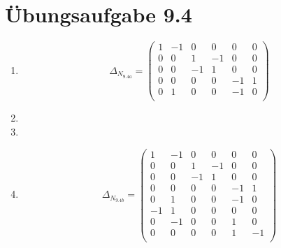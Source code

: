 \documentclass[a4paper]{scrartcl}
\begin{document}
\section*{Übungsaufgabe 9.4} 
\begin{enumerate}
    \item
        \begin{equation}
            \Delta_{N_{9.4a}} =
            \begin{pmatrix}
                 1 & -1 &  0 &  0 &  0 &  0 \\
                 0 &  0 &  1 & -1 &  0 &  0 \\
                 0 &  0 & -1 &  1 &  0 &  0 \\
                 0 &  0 &  0 &  0 & -1 &  1 \\
                 0 &  1 &  0 &  0 & -1 &  0 \\
            \end{pmatrix}
        \end{equation}
        

    \item

    \item

    \item
        \begin{equation}
            \Delta_{N_{9.4b}} =
            \begin{pmatrix}
                 1 & -1 &  0 &  0 &  0 &  0 \\
                 0 &  0 &  1 & -1 &  0 &  0 \\
                 0 &  0 & -1 &  1 &  0 &  0 \\
                 0 &  0 &  0 &  0 & -1 &  1 \\
                 0 &  1 &  0 &  0 & -1 &  0 \\
                -1 &  1 &  0 &  0 &  0 &  0 \\
                 0 & -1 &  0 &  0 &  1 &  0 \\
                 0 &  0 &  0 &  0 &  1 & -1 \\
            \end{pmatrix}
        \end{equation}


\end{enumerate}
\end{document}
